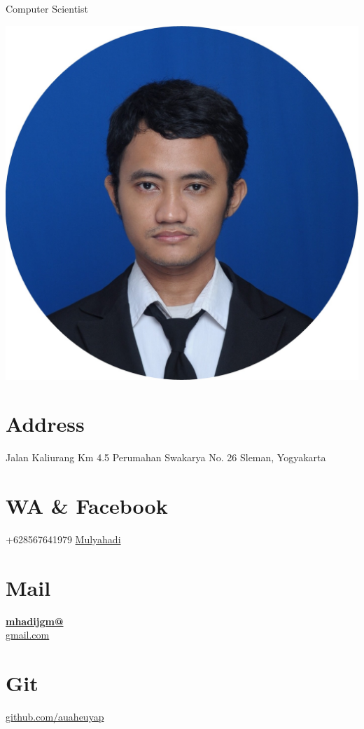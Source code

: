 \documentclass[]{friggeri-cv}
\begin{document}
      {Computer Scientist}
      

\begin{aside}
  \includegraphics[scale=0.1]{img/mul_circle.jpg}
  \section{Address}
	Jalan Kaliurang Km 4.5  
	Perumahan Swakarya No. 26
    Sleman, Yogyakarta
    ~
  \section{WA \& Facebook}
    +628567641979
    \href{https://www.facebook.com/mulyahadi.j}{Mulyahadi}
    ~
  \section{Mail}
    \href{mailto:mhaidjgm@gmail.com}{\textbf{mhadijgm@}\\gmail.com}
    ~
  \section{Git}
    \href{https://github.com/auaheuyap}{github.com/auaheuyap}
    ~

\end{aside}
\end{document}
